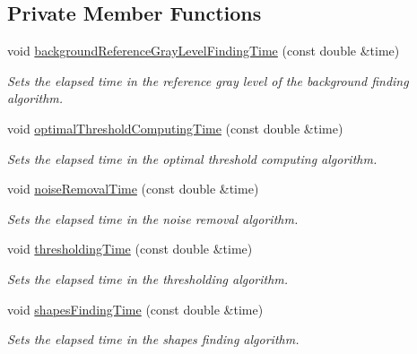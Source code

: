 \subsection*{Private Member Functions}
\begin{CompactItemize}
\item 
void \hyperlink{class_statistics_f8a60e8a89be8fe8b2c46782681c1a2c}{backgroundReferenceGrayLevelFindingTime} (const double \&time)
\begin{CompactList}\small\item\em Sets the elapsed time in the reference gray level of the background finding algorithm. \item\end{CompactList}\item 
void \hyperlink{class_statistics_eed35a930f29f4596f3715306e1e1dbc}{optimalThresholdComputingTime} (const double \&time)
\begin{CompactList}\small\item\em Sets the elapsed time in the optimal threshold computing algorithm. \item\end{CompactList}\item 
void \hyperlink{class_statistics_4ad24aec4e5491b7d3afca143e6deb05}{noiseRemovalTime} (const double \&time)
\begin{CompactList}\small\item\em Sets the elapsed time in the noise removal algorithm. \item\end{CompactList}\item 
void \hyperlink{class_statistics_ca6e07bda50783e324e8c51d8c815019}{thresholdingTime} (const double \&time)
\begin{CompactList}\small\item\em Sets the elapsed time in the thresholding algorithm. \item\end{CompactList}\item 
void \hyperlink{class_statistics_bc0a0e96adba6828ffb915a617b58ed2}{shapesFindingTime} (const double \&time)
\begin{CompactList}\small\item\em Sets the elapsed time in the shapes finding algorithm. \item\end{CompactList}\end{CompactItemize}
